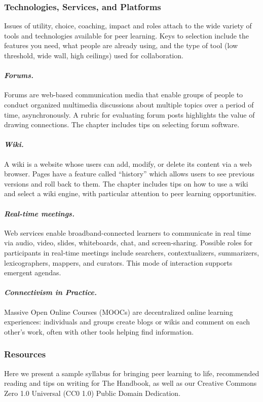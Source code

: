 \subsubsection{Technologies, Services, and Platforms}

\noindent Issues of utility, choice, coaching, impact and roles attach
to the wide variety of tools and technologies available for peer
learning. Keys to selection include the features you need, what people
are already using, and the type of tool (low threshold, wide wall,
high ceilings) used for collaboration.

\paragraph{\emph{Forums.}} Forums are web-based communication media
that enable groups of people to conduct organized multimedia discussions
about multiple topics over a period of time, asynchronously. A rubric
for evaluating forum posts highlights the value of drawing connections.
The chapter includes tips on selecting forum software.

\paragraph{\emph{Wiki.}} A
wiki is a website whose users can add, modify, or delete its content via
a web browser. Pages have a feature called ``history'' which allows
users to see previous versions and roll back to them. The chapter
includes tips on how to use a wiki and select a wiki engine, with
particular attention to peer learning opportunities.

 \paragraph{\emph{Real-time meetings.}} Web services enable broadband-connected
learners to communicate in real time via audio, video, slides,
whiteboards, chat, and screen-sharing. Possible roles for participants
in real-time meetings include searchers, contextualizers, summarizers,
lexicographers, mappers, and curators. This mode of interaction
supports emergent agendas.

\paragraph{\emph{Connectivism in Practice.}} Massive Open
Online Courses (MOOCs) are decentralized online learning experiences:
individuals and groups create blogs or wikis and comment on each
other's work, often with other tools helping find information.

\subsubsection{Resources}

\noindent Here we present a sample syllabus for bringing peer learning
to life, recommended reading and tips on writing for The Handbook, as
well as our Creative Commons Zero 1.0 Universal (CC0 1.0) Public
Domain Dedication.
